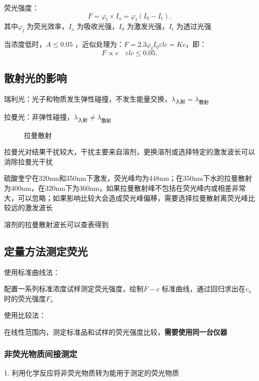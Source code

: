 荧光强度：\[
    F=\varphi_\text{f}\times I_\text{a} = \varphi_{\text{f}}\left( I_0-I_\text{t} \right)
.\]
其中$\varphi_\text{f}$ 为荧光效率，$I_\text{a}$ 为吸收光强，$I_0$ 为激发光强，$I_\text{t}$ 为透过光强
\begin{notation}
    当浓度低时，$A\le 0.05$ ，近似处理为：$F=2.3\varphi_\text{f}I_0\varepsilon lc = Kc$，即：\[
        F\propto c\quad \varepsilon lc\le 0.05
    .\]
\end{notation}
\subsection{散射光的影响}%
\label{sub:散射光的影响}
\begin{notation}
    瑞利光：光子和物质发生弹性碰撞，不发生能量交换，$\lambda_\text{入射}=\lambda_\text{散射}$
\end{notation}
\begin{notation}
    拉曼光：非弹性碰撞，$\lambda_\text{入射}\neq \lambda_\text{散射}$
\end{notation}
\begin{figure}[ht!]
    \centering
    \caption{拉曼散射}
    \label{fig:拉曼散射}
\end{figure}
拉曼光对结果干扰较大，干扰主要来自溶剂，更换溶剂或选择特定的激发波长可以消除拉曼光干扰
\begin{eg}
    硫酸奎宁在320nm和350nm下激发，荧光峰均为448nm；在350nm下水的拉曼散射为400nm，在320nm下为360nm，如果拉曼散射峰不包括在荧光峰内或相差非常大，可以忽略；如果影响比较大会造成荧光峰偏移，需要选择拉曼散射离荧光峰比较远的激发波长
\end{eg}
溶剂的拉曼散射波长可以查表得到
\subsection{定量方法测定荧光}%
\label{sub:定量方法测定荧光}
使用标准曲线法：
\begin{notation}
    配置一系列标准浓度试样测定荧光强度，绘制$F-c$ 标准曲线，通过回归求出在$c_{x}$ 时的荧光强度$F_{x}$
\end{notation}
使用比较法：
\begin{notation}
    在线性范围内，测定标准品和试样的荧光强度比较，\textbf{需要使用同一台仪器}
\end{notation}
\subsubsection*{非荧光物质间接测定}%
\label{subsub*:非荧光物质间接测定}
1. 利用化学反应将非荧光物质转为能用于测定的荧光物质

